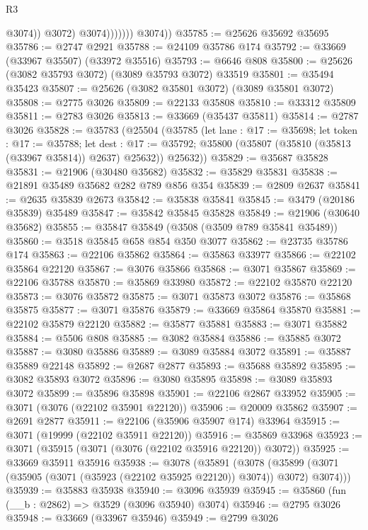 \begin{lexlean}{R3}
\begin{coremodule}
                            @3074))
                        @3072)
                      @3074)))))))
        @3074))
@35785 := @25626 @35692 @35695
@35786 := @2747 @2921
@35788 := @24109 @35786 @174
@35792 := @33669 (@33967 @35507) (@33972 @35516)
@35793 := @6646 @808
@35800 := @25626 (@3082 @35793 @3072) (@3089 @35793 @3072) @33519
@35801 := @35494 @35423
@35807 := @25626 (@3082 @35801 @3072) (@3089 @35801 @3072)
@35808 := @2775 @3026
@35809 := @22133 @35808
@35810 := @33312 @35809
@35811 := @2783 @3026
@35813 := @33669 (@35437 @35811)
@35814 := @2787 @3026
@35828 := @35783
    (@25504
      (@35785
        (let lane : @17 := @35698;
        let token : @17 := @35788;
        let dest : @17 := @35792; @35800 (@35807 (@35810 (@35813 (@33967 @35814)) @2637) @25632))
        @25632))
@35829 := @35687 @35828
@35831 := @21906 (@30480 @35682)
@35832 := @35829 @35831
@35838 := @21891 @35489 @35682 @282 @789 @856 @354
@35839 := @2809 @2637
@35841 := @2635 @35839 @2673
@35842 := @35838 @35841
@35845 := @3479 (@20186 @35839) @35489
@35847 := @35842 @35845 @35828
@35849 := @21906 (@30640 @35682)
@35855 := @35847 @35849 (@3508 (@3509 @789 @35841 @35489))
@35860 := @3518 @35845 @658 @854 @350 @3077
@35862 := @23735 @35786 @174
@35863 := @22106 @35862
@35864 := @35863 @33977
@35866 := @22102 @35864 @22120
@35867 := @3076 @35866
@35868 := @3071 @35867
@35869 := @22106 @35788
@35870 := @35869 @33980
@35872 := @22102 @35870 @22120
@35873 := @3076 @35872
@35875 := @3071 @35873 @3072
@35876 := @35868 @35875
@35877 := @3071 @35876
@35879 := @33669 @35864 @35870
@35881 := @22102 @35879 @22120
@35882 := @35877 @35881
@35883 := @3071 @35882
@35884 := @5506 @808
@35885 := @3082 @35884
@35886 := @35885 @3072
@35887 := @3080 @35886
@35889 := @3089 @35884 @3072
@35891 := @35887 @35889 @22148
@35892 := @2687 @2877
@35893 := @35688 @35892
@35895 := @3082 @35893 @3072
@35896 := @3080 @35895
@35898 := @3089 @35893 @3072
@35899 := @35896 @35898
@35901 := @22106 @2867 @33952
@35905 := @3071 (@3076 (@22102 @35901 @22120))
@35906 := @20009 @35862
@35907 := @2691 @2877
@35911 := @22106 (@35906 @35907 @174) @33964
@35915 := @3071 (@19999 (@22102 @35911 @22120))
@35916 := @35869 @33968
@35923 := @3071 (@35915 (@3071 (@3076 (@22102 @35916 @22120)) @3072))
@35925 := @33669 @35911 @35916
@35938 := @3078
    (@35891
      (@3078 (@35899 (@3071 (@35905 (@3071 (@35923 (@22102 @35925 @22120)) @3074)) @3072) @3074)))
@35939 := @35883 @35938
@35940 := @3096 @35939
@35945 := @35860 (fun (__b : @2862) => @3529 (@3096 @35940) @3074)
@35946 := @2795 @3026
@35948 := @33669 (@33967 @35946)
@35949 := @2799 @3026

\end{coremodule}
\end{lexlean}
